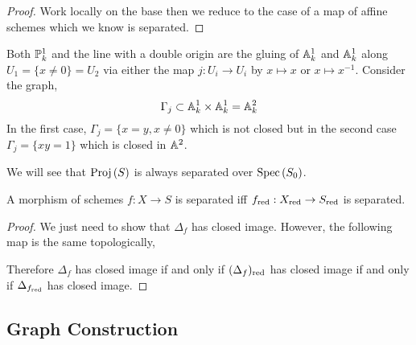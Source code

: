 \documentclass[12pt]{article}
\begin{document}
\begin{proof}
Work locally on the base then we reduce to the case of a map of affine schemes which we know is separated.
\end{proof}

\begin{example}
Both $\P^1_k$ and the line with a double origin are the gluing of $\A^1_k$ and $\A^1_k$ along $U_1 = \{ x \neq 0 \} = U_2$ via either the map $j : U_i \to U_i$ by $x \mapsto x$ or $x \mapsto x^{-1}$. Consider the graph,
\[ \Gamma_j \subset \A^1_k \times \A^1_k = \A^2_k \]
In the first case, $\Gamma_j = \{ x = y, x \neq 0 \}$ which is not closed but in the second case $\Gamma_j = \{ xy = 1 \}$ which is closed in $\A^2$. 
\end{example}

\begin{example}
We will see that $\Proj{S}$ is always separated over $\Spec{S_0}$. 
\end{example}

\begin{prop}
A morphism of schemes $f : X \to S$ is separated iff $f_{\red} : X_{\red} \to S_{\red}$ is separated.
\end{prop}

\begin{proof}
We just need to show that $\Delta_f$ has closed image. However, the following map is the same topologically,
\begin{center}
\end{center}
Therefore $\Delta_f$ has closed image if and only if $(\Delta_f)_\red$ has closed image if and only if $\Delta_{f_{\red}}$ has closed image.
\end{proof}

\subsection{Graph Construction}
\end{document}
